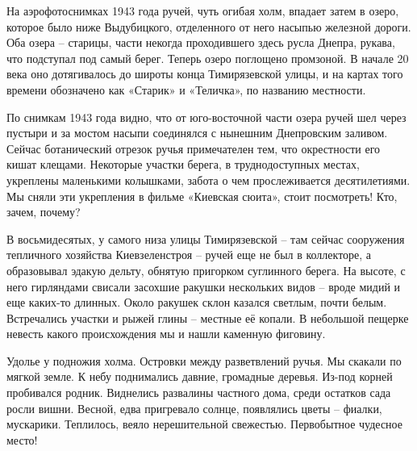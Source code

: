 На аэрофотоснимках 1943 года ручей, чуть огибая холм, впадает затем в озеро, которое было ниже Выдубицкого, отделенного от него насыпью железной дороги. Оба озера – старицы, части некогда проходившего здесь русла Днепра, рукава, что подступал под самый берег. Теперь озеро поглощено промзоной. В начале 20 века оно дотягивалось до широты конца Тимирязевской улицы, и на картах того времени обозначено как «Старик» и «Теличка», по названию местности. 



По снимкам 1943 года видно, что от юго-восточной части озера ручей шел через пустыри и за мостом насыпи соединялся с нынешним Днепровским заливом. Сейчас ботанический отрезок ручья примечателен тем, что окрестности его кишат клещами. Некоторые участки берега, в труднодоступных местах, укреплены маленькими колышками, забота о чем прослеживается десятилетиями. Мы сняли эти укрепления в фильме «Киевская сюита», стоит посмотреть! Кто, зачем, почему?

В восьмидесятых, у самого низа улицы Тимирязевской – там сейчас сооружения тепличного хозяйства Киевзеленстроя – ручей еще не был в коллекторе, а образовывал эдакую дельту, обнятую пригорком суглинного берега. На высоте, с него гирляндами свисали засохшие ракушки нескольких видов – вроде мидий и еще каких-то длинных. Около ракушек склон казался светлым, почти белым. Встречались участки и рыжей глины – местные её копали. В небольшой пещерке невесть какого происхождения мы и нашли каменную фиговину.

Удолье у подножия холма. Островки между разветвлений ручья. Мы скакали по мягкой земле. К небу поднимались давние, громадные деревья. Из-под корней пробивался родник. Виднелись развалины частного дома, среди остатков сада росли вишни. Весной, едва пригревало солнце, появлялись цветы – фиалки, мускарики. Теплилось, веяло нерешительной свежестью. Первобытное чудесное место!

